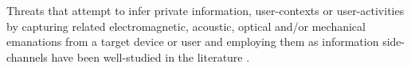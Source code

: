\documentclass[]{IEEEtran}
\begin{document}
Threats that attempt to infer private information, user-contexts or user-activities by capturing related electromagnetic, acoustic, optical and/or mechanical emanations from a target device or user and employing them as information side-channels have been well-studied in the literature \cite{quisquater2001electromagnetic,kuhn2002optical,agrawal2003side,asonov2004keyboard,berger2006dictionary,backes2008compromising,backes2009tempest,vuagnoux2009compromising,backes2010acoustic,hayashi2014threat,Ali:2015:KRU:2789168.2790109,WANG201520,Li:2016:CMP:2976749.2978397}. %
\end{document}
